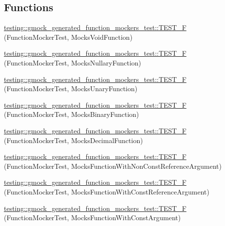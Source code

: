 \subsection*{Functions}
\begin{DoxyCompactItemize}
\item 
\hyperlink{namespacetesting_1_1gmock__generated__function__mockers__test_aee64a5117451830331c321aecd10025f}{testing\+::gmock\+\_\+generated\+\_\+function\+\_\+mockers\+\_\+test\+::\+T\+E\+S\+T\+\_\+F} (Function\+Mocker\+Test, Mocks\+Void\+Function)
\item 
\hyperlink{namespacetesting_1_1gmock__generated__function__mockers__test_a0a1348d6814b9bc02ad5b2ac46361ac0}{testing\+::gmock\+\_\+generated\+\_\+function\+\_\+mockers\+\_\+test\+::\+T\+E\+S\+T\+\_\+F} (Function\+Mocker\+Test, Mocks\+Nullary\+Function)
\item 
\hyperlink{namespacetesting_1_1gmock__generated__function__mockers__test_a835348f70c0335c9213153f72138d12f}{testing\+::gmock\+\_\+generated\+\_\+function\+\_\+mockers\+\_\+test\+::\+T\+E\+S\+T\+\_\+F} (Function\+Mocker\+Test, Mocks\+Unary\+Function)
\item 
\hyperlink{namespacetesting_1_1gmock__generated__function__mockers__test_aa8d2e25f60ad3ac49736ee90fb7ac190}{testing\+::gmock\+\_\+generated\+\_\+function\+\_\+mockers\+\_\+test\+::\+T\+E\+S\+T\+\_\+F} (Function\+Mocker\+Test, Mocks\+Binary\+Function)
\item 
\hyperlink{namespacetesting_1_1gmock__generated__function__mockers__test_a279ba48bf6f937eecfc12530b9dde497}{testing\+::gmock\+\_\+generated\+\_\+function\+\_\+mockers\+\_\+test\+::\+T\+E\+S\+T\+\_\+F} (Function\+Mocker\+Test, Mocks\+Decimal\+Function)
\item 
\hyperlink{namespacetesting_1_1gmock__generated__function__mockers__test_a852587f21316c0341b60b29d44cd61ea}{testing\+::gmock\+\_\+generated\+\_\+function\+\_\+mockers\+\_\+test\+::\+T\+E\+S\+T\+\_\+F} (Function\+Mocker\+Test, Mocks\+Function\+With\+Non\+Const\+Reference\+Argument)
\item 
\hyperlink{namespacetesting_1_1gmock__generated__function__mockers__test_a5367aba117b37aff1ceb4be3d4732559}{testing\+::gmock\+\_\+generated\+\_\+function\+\_\+mockers\+\_\+test\+::\+T\+E\+S\+T\+\_\+F} (Function\+Mocker\+Test, Mocks\+Function\+With\+Const\+Reference\+Argument)
\item 
\hyperlink{namespacetesting_1_1gmock__generated__function__mockers__test_a957ee1afed65097f1c25790f266ec91e}{testing\+::gmock\+\_\+generated\+\_\+function\+\_\+mockers\+\_\+test\+::\+T\+E\+S\+T\+\_\+F} (Function\+Mocker\+Test, Mocks\+Function\+With\+Const\+Argument)

\end{DoxyCompactItemize}
